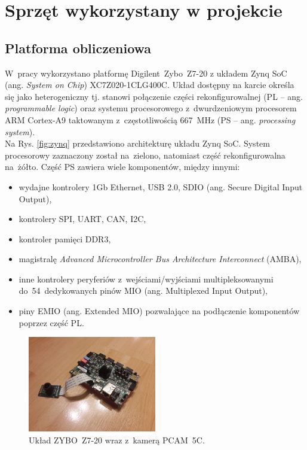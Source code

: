 \chapter{Sprzęt wykorzystany w projekcie}
\label{cha:Zybo_PCAM_dron}
\section{Platforma obliczeniowa}
\label{sec:platforma_obliczeniowa}
W~pracy wykorzystano platformę Digilent~Zybo~Z7-20 z układem Zynq SoC (ang. \textit{System on Chip}) XC7Z020-1CLG400C. %
Układ dostępny na karcie określa się jako heterogeniczny tj. stanowi połączenie części rekonfigurowalnej (PL -- ang. \textit{programmable logic}) oraz systemu procesorowego z~dwurdzeniowym procesorem ARM Cortex-A9 taktowanym z~częstotliwością 667~MHz (PS -- ang. \textit{processing system}).\\
Na Rys. \ref{fig:zynq} przedstawiono architekturę układu Zynq SoC. System procesorowy zaznaczony został na~zielono, natomiast część rekonfigurowalna na~żółto. Część PS zawiera wiele komponentów, między innymi:
\begin{itemize}
	\item wydajne kontrolery 1Gb Ethernet, USB 2.0, SDIO (ang. Secure Digital Input Output),
	\item kontrolery SPI, UART, CAN, I2C,
	\item kontroler pamięci DDR3,
	\item magistralę \textit{Advanced Microcontroller Bus Architecture Interconnect} (AMBA),
	\item inne kontrolery peryferiów z~wejściami/wyjściami multipleksowanymi do~54~dedykowanych pinów MIO (ang. Multiplexed Input Output),
	\item piny EMIO (ang. Extended MIO) pozwalające na podłączenie komponentów poprzez część PL.
\end{itemize}
\begin{figure}[h]
	\centering
	\includegraphics[width=0.5\textwidth]{plytka_kamera.jpg}
	\caption{Układ ZYBO~Z7-20 wraz z~kamerą PCAM~5C.}
	\label{fig:plytka_kamera}
\end{figure}
